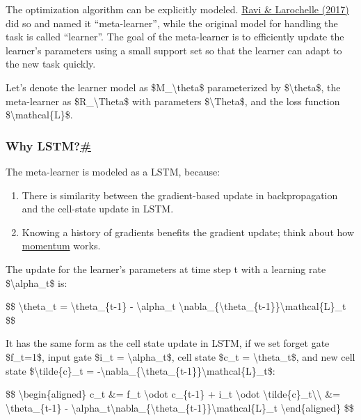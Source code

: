 The optimization algorithm can be explicitly modeled. \href{https://openreview.net/pdf?id=rJY0-Kcll}{Ravi \& Larochelle (2017)} did so and named it ``meta-learner'', while the original model for handling the task is called ``learner''. The goal of the meta-learner is to efficiently update the learner's parameters using a small support set so that the learner can adapt to the new task quickly.

Let's denote the learner model as \$M\_\textbackslash theta\$ parameterized by \$\textbackslash theta\$, the meta-learner as \$R\_\textbackslash Theta\$ with parameters \$\textbackslash Theta\$, and the loss function \$\textbackslash mathcal\{L\}\$.

\subsubsection{\texorpdfstring{Why LSTM?\hyperref[why-lstm]{\#}}{Why LSTM?\#}}\label{why-lstm}

The meta-learner is modeled as a LSTM, because:

\begin{enumerate}
\tightlist
\item
  There is similarity between the gradient-based update in backpropagation and the cell-state update in LSTM.
\item
  Knowing a history of gradients benefits the gradient update; think about how \href{http://ruder.io/optimizing-gradient-descent/index.html\#momentum}{momentum} works.
\end{enumerate}

The update for the learner's parameters at time step t with a learning rate \$\textbackslash alpha\_t\$ is:

\$\$ \textbackslash theta\_t = \textbackslash theta\_\{t-1\} - \textbackslash alpha\_t \textbackslash nabla\_\{\textbackslash theta\_\{t-1\}\}\textbackslash mathcal\{L\}\_t \$\$

It has the same form as the cell state update in LSTM, if we set forget gate \$f\_t=1\$, input gate \$i\_t = \textbackslash alpha\_t\$, cell state \$c\_t = \textbackslash theta\_t\$, and new cell state \$\textbackslash tilde\{c\}\_t = -\textbackslash nabla\_\{\textbackslash theta\_\{t-1\}\}\textbackslash mathcal\{L\}\_t\$:

\$\$ \textbackslash begin\{aligned\} c\_t \&= f\_t \textbackslash odot c\_\{t-1\} + i\_t \textbackslash odot \textbackslash tilde\{c\}\_t\textbackslash\textbackslash{} \&= \textbackslash theta\_\{t-1\} - \textbackslash alpha\_t\textbackslash nabla\_\{\textbackslash theta\_\{t-1\}\}\textbackslash mathcal\{L\}\_t \textbackslash end\{aligned\} \$\$


